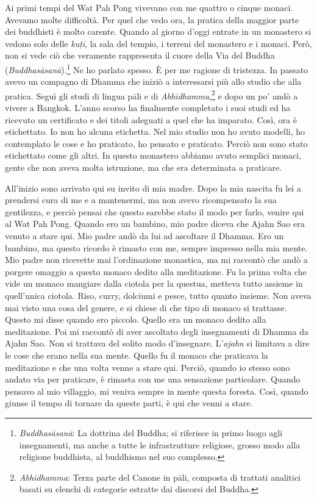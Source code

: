Ai primi tempi del Wat Pah Pong vivevano con me quattro o cinque monaci.
Avevamo molte difficoltà. Per quel che vedo ora, la pratica della
maggior parte dei buddhisti è molto carente. Quando al giorno d'oggi
entrate in un monastero si vedono solo delle \emph{kuṭī}, la sala del
tempio, i terreni del monastero e i monaci. Però, non si vede ciò che
veramente rappresenta il cuore della Via del Buddha
(\emph{Buddhasāsanā}).\footnote{\emph{Buddhasāsanā}: La dottrina del
  Buddha; si riferisce in primo luogo agli insegnamenti, ma anche a
  tutte le infrastrutture religiose, grosso modo alla religione
  buddhista, al buddhismo nel suo complesso.} Ne ho parlato spesso. È
per me ragione di tristezza. In passato avevo un compagno di Dhamma che
iniziò a interessarsi più allo studio che alla pratica. Seguì gli studi
di lingua pāli e di \emph{Abhidhamma},\footnote{\emph{Abhidhamma}: Terza
  parte del Canone in pāli, composta di trattati analitici basati su
  elenchi di categorie estratte dai discorsi del Buddha.} e dopo un po'
andò a vivere a Bangkok. L'anno scorso ha finalmente completato i suoi
studi ed ha ricevuto un certificato e dei titoli adeguati a quel che ha
imparato. Così, ora è etichettato. Io non ho alcuna etichetta. Nel mio
studio non ho avuto modelli, ho contemplato le cose e ho praticato, ho
pensato e praticato. Perciò non sono stato etichettato come gli altri.
In questo monastero abbiamo avuto semplici monaci, gente che non aveva
molta istruzione, ma che era determinata a praticare.

All'inizio sono arrivato qui su invito di mia madre. Dopo la mia nascita
fu lei a prendersi cura di me e a mantenermi, ma non avevo ricompensato
la sua gentilezza, e perciò pensai che questo sarebbe stato il modo per
farlo, venire qui al Wat Pah Pong. Quando ero un bambino, mio padre
diceva che Ajahn Sao era venuto a stare qui. Mio padre andò da lui ad
ascoltare il Dhamma. Ero un bambino, ma questo ricordo è rimasto con me,
sempre impresso nella mia mente. Mio padre non ricevette mai
l'ordinazione monastica, ma mi raccontò che andò a porgere omaggio a
questo monaco dedito alla meditazione. Fu la prima volta che vide un
monaco mangiare dalla ciotola per la questua, metteva tutto assieme in
quell'unica ciotola. Riso, curry, dolciumi e pesce, tutto quanto
insieme. Non aveva mai visto una cosa del genere, e si chiese di che
tipo di monaco si trattasse. Questo mi disse quando ero piccolo. Quello
era un monaco dedito alla meditazione. Poi mi raccontò di aver ascoltato
degli insegnamenti di Dhamma da Ajahn Sao. Non si trattava del solito
modo d'insegnare. L'\emph{ajahn} si limitava a dire le cose che erano
nella sua mente. Quello fu il monaco che praticava la meditazione e che
una volta venne a stare qui. Perciò, quando io stesso sono andato via
per praticare, è rimasta con me una sensazione particolare. Quando
pensavo al mio villaggio, mi veniva sempre in mente questa foresta.
Così, quando giunse il tempo di tornare da queste parti, è qui che venni
a stare.

